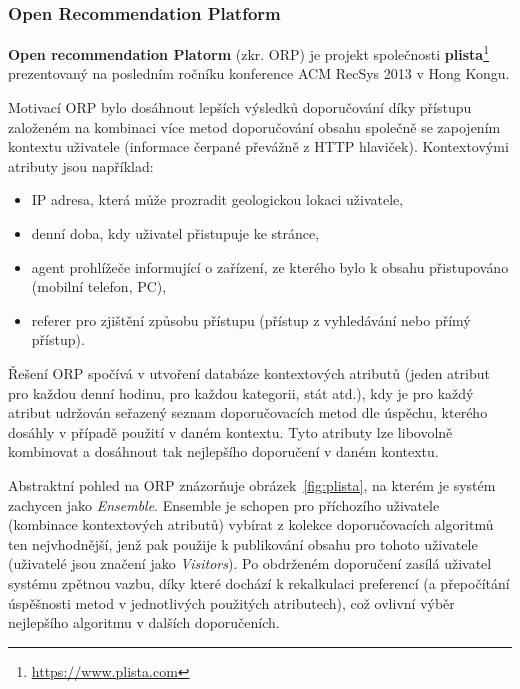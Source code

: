 \documentclass[thesis=M,czech]{FITthesis}[2014/05/07]
\begin{document}
\subsubsection{Open Recommendation Platform}
\label{sub:orp}
\textbf{Open recommendation Platorm} (zkr. ORP) je projekt společnosti \textbf{plista}\footnote{\url{https://www.plista.com}} prezentovaný na posledním ročníku konference ACM RecSys 2013 v Hong Kongu. 

Motivací ORP bylo dosáhnout lepších výsledků doporučování díky přístupu založeném na kombinaci více metod doporučování obsahu společně se zapojením kontextu uživatele (informace čerpané převážně z HTTP hlaviček). Kontextovými atributy jsou například:

\begin{itemize}
	\item IP adresa, která může prozradit geologickou lokaci uživatele,
	\item denní doba, kdy uživatel přistupuje ke stránce,
	\item agent prohlížeče informující o zařízení, ze kterého bylo k obsahu přistupováno (mobilní telefon, PC),
	\item referer pro zjištění způsobu přístupu (přístup z vyhledávání nebo přímý přístup). 
\end{itemize}

Řešení ORP spočívá v utvoření databáze kontextových atributů (jeden atribut pro každou denní hodinu, pro každou kategorii, stát atd.), kdy je pro každý atribut udržován seřazený seznam doporučovacích metod dle úspěchu, kterého dosáhly v případě použití v daném kontextu. Tyto atributy lze libovolně kombinovat a dosáhnout tak nejlepšího doporučení v daném kontextu.

Abstraktní pohled na ORP znázorňuje obrázek~\ref{fig:plista}, na kterém je systém zachycen jako \emph{Ensemble}. Ensemble je schopen pro příchozího uživatele (kombinace kontextových atributů) vybírat z kolekce doporučovacích algoritmů ten nejvhodnější, jenž pak použije k publikování obsahu pro tohoto uživatele (uživatelé jsou značení jako \emph{Visitors}). Po obdrženém doporučení zasílá uživatel systému zpětnou vazbu, díky které dochází k rekalkulaci preferencí (a přepočítání úspěšnosti metod v jednotlivých použitých atributech), což ovlivní výběr nejlepšího algoritmu v dalších doporučeních.
\end{document}
